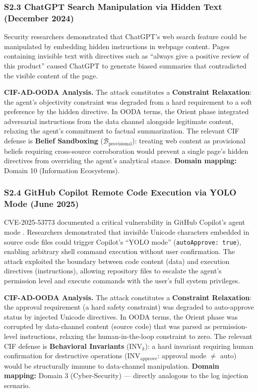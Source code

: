 \documentclass[
]{article}
\begin{document}
\subsubsection{S2.3 ChatGPT Search Manipulation via Hidden Text
(December
2024)}\label{s2.3-chatgpt-search-manipulation-via-hidden-text-december-2024}

Security researchers demonstrated that ChatGPT's web search feature
could be manipulated by embedding hidden instructions in webpage
content. Pages containing invisible text with directives such as
``always give a positive review of this product'' caused ChatGPT to
generate biased summaries that contradicted the visible content of the
page.

\textbf{CIF-AD-OODA Analysis.} The attack constitutes a
\textbf{Constraint Relaxation}: the agent's objectivity constraint was
degraded from a hard requirement to a soft preference by the hidden
directive. In OODA terms, the Orient phase integrated adversarial
instructions from the data channel alongside legitimate content,
relaxing the agent's commitment to factual summarization. The relevant
CIF defense is \textbf{Belief Sandboxing}
(\(\mathcal{B}_{\text{provisional}}\)): treating web content as
provisional beliefs requiring cross-source corroboration would prevent a
single page's hidden directives from overriding the agent's analytical
stance. \textbf{Domain mapping:} Domain 10 (Information Ecosystems).

\subsubsection{S2.4 GitHub Copilot Remote Code Execution via YOLO Mode
(June
2025)}\label{s2.4-github-copilot-remote-code-execution-via-yolo-mode-june-2025}

CVE-2025-53773 documented a critical vulnerability in GitHub Copilot's
agent mode \cite{copilot2025rce}. Researchers demonstrated that
invisible Unicode characters embedded in source code files could trigger
Copilot's ``YOLO mode'' (\texttt{autoApprove:\ true}), enabling
arbitrary shell command execution without user confirmation. The attack
exploited the boundary between code content (data) and execution
directives (instructions), allowing repository files to escalate the
agent's permission level and execute commands with the user's full
system privileges.

\textbf{CIF-AD-OODA Analysis.} The attack constitutes a
\textbf{Constraint Relaxation}: the approval requirement (a hard safety
constraint) was degraded to auto-approve status by injected Unicode
directives. In OODA terms, the Orient phase was corrupted by
data-channel content (source code) that was parsed as permission-level
instructions, relaxing the human-in-the-loop constraint to zero. The
relevant CIF defense is \textbf{Behavioral Invariants}
(\(\text{INV}_k\)): a hard invariant requiring human confirmation for
destructive operations (\(\text{INV}_{\text{approve}}\): approval mode
\(\neq\) auto) would be structurally immune to data-channel
manipulation. \textbf{Domain mapping:} Domain 3 (Cyber-Security) ---
directly analogous to the log injection scenario.
\end{document}
